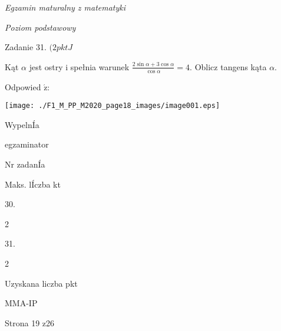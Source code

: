 \documentclass[a4paper,12pt]{article}
\begin{document}
{\it Egzamin maturalny z matematyki}

{\it Poziom podstawowy}

Zadanie 31. $(2pktJ$

Kąt $\alpha$ jest ostry i spełnia warunek $\displaystyle \frac{2\sin\alpha+3\cos\alpha}{\cos\alpha}=4$. Oblicz tangens kąta $\alpha.$

Odpowied $\acute{\mathrm{z}}$:
\begin{center}
\texttt{[image: ./F1\_M\_PP\_M2020\_page18\_images/image001.eps]}
\end{center}
WypelnÍa

egzaminator

Nr zadanÍa

Maks. lÍczba kt

30.

2

31.

2

Uzyskana liczba pkt

MMA-IP

Strona 19 z26
\end{document}
